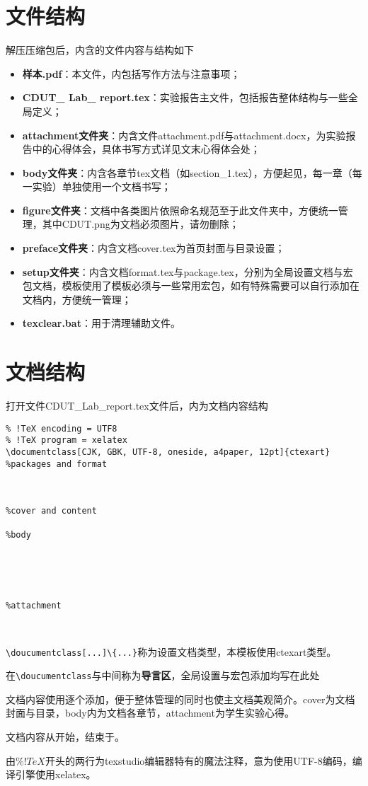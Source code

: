 \section{文件结构}
解压压缩包后，内含的文件内容与结构如下
\begin{itemize}
\item \textbf{样本.pdf}：本文件，内包括写作方法与注意事项；
\item \textbf{CDUT\_ Lab\_ report.tex}：实验报告主文件，包括报告整体结构与一些全局定义；
\item \textbf{attachment文件夹}：内含文件attachment.pdf与attachment.docx，为实验报告中的心得体会，具体书写方式详见文末心得体会处；
\item \textbf{body文件夹}：内含各章节tex文档（如section\_1.tex），方便起见，每一章（每一实验）单独使用一个文档书写；
\item \textbf{figure文件夹}：文档中各类图片依照命名规范至于此文件夹中，方便统一管理，其中CDUT.png为文档必须图片，请勿删除；
\item \textbf{preface文件夹}：内含文档cover.tex为首页封面与目录设置；
\item \textbf{setup文件夹}：内含文档format.tex与package.tex，分别为全局设置文档与宏包文档，模板使用了模板必须与一些常用宏包，如有特殊需要可以自行添加在文档内，方便统一管理；
\item \textbf{texclear.bat}：用于清理辅助文件。
\end{itemize}

\section{文档结构}
打开文件CDUT\_Lab\_report.tex文件后，内为文档内容结构
\begin{verbatim}
% !TeX encoding = UTF8
% !TeX program = xelatex
\documentclass[CJK, GBK, UTF-8, oneside, a4paper, 12pt]{ctexart}
%packages and format



%cover and content

%body





%attachment



\end{verbatim}

\verb|\doucumentclass[...]\{...}|称为设置文档类型，本模板使用ctexart类型。

在\verb|\doucumentclass|与\verb||中间称为\textbf{导言区}，全局设置与宏包添加均写在此处

文档内容使用\verb||逐个添加，便于整体管理的同时也使主文档美观简介。cover为文档封面与目录，body内为文档各章节，attachment为学生实验心得。

文档内容从\verb||开始，结束于\verb||。

由$\% !TeX$开头的两行为texstudio编辑器特有的魔法注释，意为使用UTF-8编码，编译引擎使用xelatex。